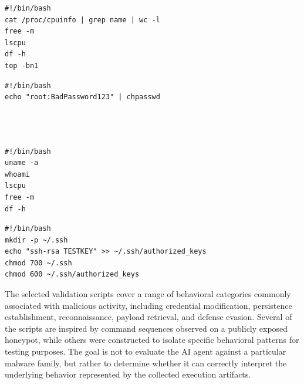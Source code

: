 \begin{minipage}[t][3.0cm][t]{0.45\textwidth}
\vspace{-6mm}
\begin{verbatim}
#!/bin/bash
cat /proc/cpuinfo | grep name | wc -l
free -m
lscpu
df -h
top -bn1
\end{verbatim}
\end{minipage}
\hfill
\begin{minipage}[t][3.0cm][t]{0.45\textwidth}
\vspace{-6mm}
\begin{verbatim}
#!/bin/bash
echo "root:BadPassword123" | chpasswd




\end{verbatim}
\end{minipage}

\vspace{1em}

\begin{minipage}[t][3.0cm][t]{0.45\textwidth}
\vspace{-6mm}
\begin{verbatim}
#!/bin/bash
uname -a
whoami
lscpu
free -m
df -h
\end{verbatim}
\end{minipage}
\hfill
\begin{minipage}[t][3.0cm][t]{0.45\textwidth}
\vspace{-6mm}
\begin{verbatim}
#!/bin/bash
mkdir -p ~/.ssh
echo "ssh-rsa TESTKEY" >> ~/.ssh/authorized_keys
chmod 700 ~/.ssh
chmod 600 ~/.ssh/authorized_keys

\end{verbatim}
\end{minipage}

\vspace{1em}

The selected validation scripts cover a range of behavioral categories commonly associated with malicious activity, including credential modification, persistence establishment, reconnaissance, payload retrieval, and defense evasion. Several of the scripts are inspired by command sequences observed on a publicly exposed honeypot, while others were constructed to isolate specific behavioral patterns for testing purposes. The goal is not to evaluate the AI agent against a particular malware family, but rather to determine whether it can correctly interpret the underlying behavior represented by the collected execution artifacts.

